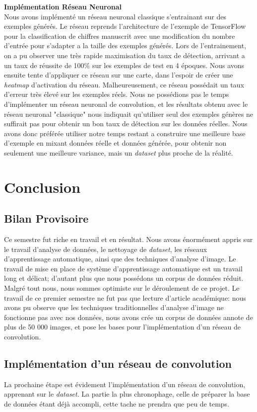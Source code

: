 \documentclass[a4paper, 12pt, titlepage, oneside, french]{article}
\begin{document}
	\textbf{Implémentation Réseau Neuronal}\\
	\indent Nous avons implémenté un réseau neuronal classique s'entrainant sur des exemples générés. Le réseau reprends l'architecture de l'exemple de TensorFlow pour la classification de chiffres manuscrit avec une modification du nombre d'entrée pour s'adapter a la taille des exemples générés. Lors de l'entrainement, on a pu observer une très rapide maximisation du taux de détection, arrivant a un taux de réussite de 100\% sur les exemples de test en 4 époques. Nous avons ensuite tente d'appliquer ce réseau sur une carte, dans l'espoir de créer une \textit{heatmap} d'activation du réseau. Malheureusement, ce réseau possédait un taux d'erreur très élevé sur les exemples réels. Nous ne possédions pas le temps d'implémenter un réseau neuronal de convolution, et les résultats obtenu avec le réseau neuronal "classique" nous indiquait qu'utiliser seul des exemples génères ne suffirait pas pour obtenir un bon taux de détection sur les données réelles. Nous avons donc préférée utiliser notre temps restant a construire une meilleure base d'exemple en mixant données réelle et données générée, pour obtenir non seulement une meilleure variance, mais un \textit{dataset} plus proche de la réalité.
\newpage
\section{Conclusion}
	\subsection{Bilan Provisoire} %
	Ce semestre fut riche en travail et en résultat. Nous avons énormément appris sur le travail d'analyse de données, le nettoyage de \textit{dataset}, les réseaux d'apprentissage automatique, ainsi que des techniques d'analyse d'image. Le travail de mise en place de système d'apprentissage automatique est un travail long et délicat; d'autant plus que nous possédons un corpus de données réduit. Malgré tout nous, nous sommes optimiste sur le déroulement de ce projet. Le travail de ce premier semestre ne fut pas que lecture d'article académique: nous avons pu observe que les techniques traditionnelles d'analyse d'image ne fonctionne pas avec nos données, nous avons crée un corpus de données annote de plus de 50 000 images, et pose les bases pour l'implémentation d'un réseau de convolution.
	\subsection{Implémentation d'un réseau de convolution}
	La prochaine étape est évidement l'implémentation d'un réseau de convolution, apprenant sur le \textit{dataset}. La partie la plus chronophage, celle de préparer la base de données étant déjà accompli, cette tache ne prendra que peu de temps. 
\end{document}

